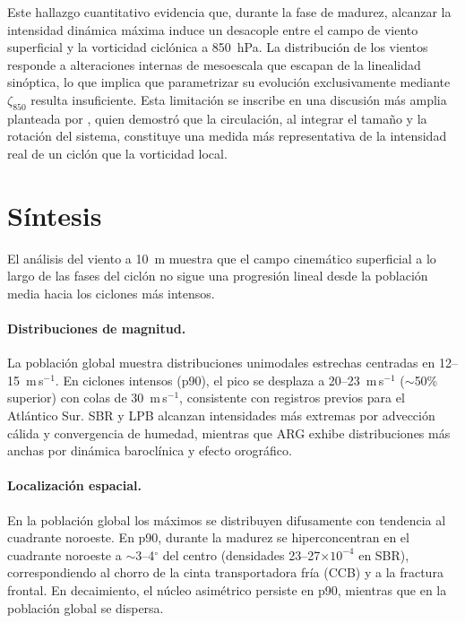 Este hallazgo cuantitativo evidencia que, durante la fase de madurez, alcanzar la intensidad dinámica máxima induce un desacople entre el campo de viento superficial y la vorticidad ciclónica a 850~hPa. 
La distribución de los vientos responde a alteraciones internas de mesoescala que escapan de la linealidad sinóptica, lo que implica que parametrizar su evolución exclusivamente mediante $\zeta_{850}$ resulta insuficiente. 
Esta limitación se inscribe en una discusión más amplia planteada por \citet{sinclair1997objective}, quien demostró que la circulación, al integrar el tamaño y la rotación del sistema, constituye una medida más representativa de la intensidad real de un ciclón que la vorticidad local.

\section{Síntesis}\label{sec:sintesis_wind10}

El análisis del viento a 10~m muestra que el campo cinemático superficial a lo largo de las fases del ciclón no sigue una progresión lineal desde la población media hacia los ciclones más intensos.

\paragraph{Distribuciones de magnitud.}
La población global muestra distribuciones unimodales estrechas centradas en 12--15~m\,s$^{-1}$. En ciclones intensos (p90), el pico se desplaza a 20--23~m\,s$^{-1}$ (${\sim}$50\% superior) con colas de 30~m\,s$^{-1}$, consistente con registros previos para el Atlántico Sur. SBR y LPB alcanzan intensidades más extremas por advección cálida y convergencia de humedad, mientras que ARG exhibe distribuciones más anchas por dinámica baroclínica y efecto orográfico.

\paragraph{Localización espacial.}
En la población global los máximos se distribuyen difusamente con tendencia al cuadrante noroeste. 
En p90, durante la madurez se hiperconcentran en el cuadrante noroeste a ${\sim}$3--4$^{\circ}$ del centro (densidades 23--27$\times10^{-4}$ en SBR), correspondiendo al chorro de la cinta transportadora fría (CCB) y a la fractura frontal. 
En decaimiento, el núcleo asimétrico persiste en p90, mientras que en la población global se dispersa.

